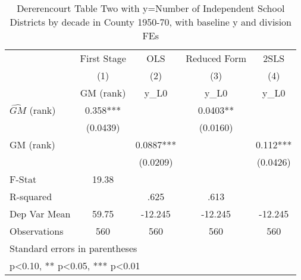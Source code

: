 \begin{table}[htbp]\centering
\def\sym#1{\ifmmode^{#1}\else\(^{#1}\)\fi}
\caption{Dererencourt Table Two with y=Number of Independent School Districts by decade in County 1950-70, with baseline y and division FEs}
\begin{tabular}{l*{4}{c}}
\toprule
                    & First Stage   &         OLS   &Reduced Form   &        2SLS   \\
                    &\multicolumn{1}{c}{(1)}&\multicolumn{1}{c}{(2)}&\multicolumn{1}{c}{(3)}&\multicolumn{1}{c}{(4)}\\
                    &\multicolumn{1}{c}{GM  (rank)}&\multicolumn{1}{c}{y\_L0}&\multicolumn{1}{c}{y\_L0}&\multicolumn{1}{c}{y\_L0}\\
\midrule
$\hat{GM}$ (rank)   &       0.358***&               &      0.0403** &               \\
                    &    (0.0439)   &               &    (0.0160)   &               \\
\addlinespace
GM  (rank)          &               &      0.0887***&               &       0.112***\\
                    &               &    (0.0209)   &               &    (0.0426)   \\
\midrule
F-Stat              &       19.38   &               &               &               \\
R-squared           &               &        .625   &        .613   &               \\
Dep Var Mean        &       59.75   &     -12.245   &     -12.245   &     -12.245   \\
Observations        &         560   &         560   &         560   &         560   \\
\bottomrule
\multicolumn{5}{l}{\footnotesize Standard errors in parentheses}\\
\multicolumn{5}{l}{\footnotesize * p<0.10, ** p<0.05, *** p<0.01}\\
\end{tabular}
\end{table}
